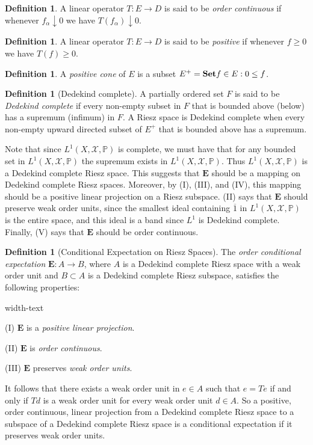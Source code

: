 \documentclass[letterpaper,10pt,oneside,onecolumn,reqno]{amsart}
\renewcommand{\P}{\mathbb P}
\newcommand{\X}{\mathcal X}
\theoremstyle{definition}
\newtheorem{defn}[thm]{Definition}
\newcommand{\catname}[1]{{\normalfont\textbf{#1}}}
\newcommand{\Set}{\catname{Set}}
\renewcommand{\bar}[1]{\overline{#1}}
\begin{document}
\begin{defn}\label{def:14}
A linear operator $T : E \to D$ is said to be \emph{order continuous} if whenever $f_{\alpha} \downarrow 0$ we have $T(f_{\alpha}) \downarrow 0$.
\end{defn}
\begin{defn}\label{def:15}
A linear operator $T : E \to D$ is said to be \emph{positive} if whenever $f \geq 0$ we have $T(f) \geq 0$.
\end{defn}

\begin{defn}\label{def:16}
A \emph{positive cone} of $E$ is a subset $E^+ = \Set{f \in E : 0 \leq f}$.
\end{defn}


\begin{defn}[Dedekind complete]\label{def:17}
A partially ordered set $F$ is said to be \emph{Dedekind complete} if every non-empty subset in $F$ that is bounded above (below) has a supremum (infimum) in $F$. A Riesz space is Dedekind complete when every non-empty upward directed subset of $E^+$ that is bounded above has a supremum.
\end{defn}


Note that since $L^1(X,\X,\P)$ is complete, we must have that for any bounded set in $L^1(X,\X,\P)$ the supremum exists in $L^1(X,\X,\P)$. Thus $L^1(X,\X,\P)$ is a Dedekind complete Riesz space. This suggests that $\mathbf{E}$ should be a mapping on Dedekind complete Riesz spaces. Moreover, by (I), (III), and (IV), this mapping should be a positive linear projection on a Riesz subspace. (II) says that $\mathbf{E}$ should preserve weak order units, since the smallest ideal containing $\bar{1}$ in $L^1(X,\X,\P)$ is the entire space, and this ideal is a band since $L^1$ is Dedekind complete. Finally, (V) says that $\mathbf{E}$ should be order continuous. 

\begin{defn}[Conditional Expectation on Riesz Spaces]\label{def:18}
The \emph{order conditional expectation} $\mathbf{E}: A \to B$, where $A$ is a Dedekind complete Riesz space with a weak order unit and $B \subset A$ is a Dedekind complete Riesz subspace, satisfies the following properties:

\begin{deflist}{width-text}
\item[(I)] $\mathbf{E}$ is a \emph{positive linear projection}.
\item[(II)] $\mathbf{E}$ is \emph{order continuous}.
\item[(III)] $\mathbf{E}$ preserves \emph{weak order units}.
\end{deflist}

It follows that there exists a weak order unit in $e \in A$ such that $e = Te$ if and only if $Td$ is a weak order unit for every weak order unit $d \in A$. So a positive, order continuous, linear projection from a Dedekind complete Riesz space to a subspace of a Dedekind complete Riesz space is a conditional expectation if it preserves weak order units.
\end{defn}
\end{document}
